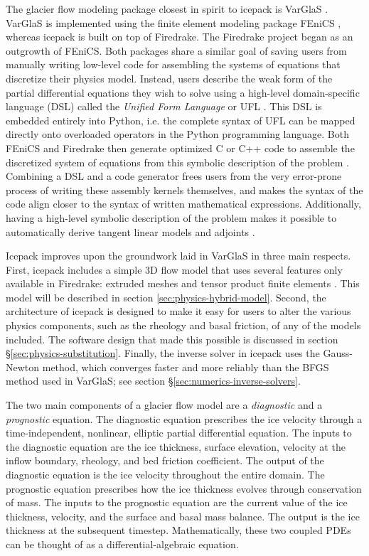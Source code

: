 \documentclass[journal abbreviation, manuscript]{copernicus}
\begin{document}
The glacier flow modeling package closest in spirit to icepack is VarGlaS \citep{brinkerhoff2013data}.
VarGlaS is implemented using the finite element modeling package FEniCS \citep{logg2012automated}, whereas icepack is built on top of Firedrake.
The Firedrake project began as an outgrowth of FEniCS.
Both packages share a similar goal of saving users from manually writing low-level code for assembling the systems of equations that discretize their physics model.
Instead, users describe the weak form of the partial differential equations they wish to solve using a high-level domain-specific language (DSL) called the \emph{Unified Form Language} or UFL \citep{alnaes2014unified}.
This DSL is embedded entirely into Python, i.e. the complete syntax of UFL can be mapped directly onto overloaded operators in the Python programming language.
Both FEniCS and Firedrake then generate optimized C or C++ code to assemble the discretized system of equations from this symbolic description of the problem \citep{kirby2006compiler, rathgeber2016firedrake}.
Combining a DSL and a code generator frees users from the very error-prone process of writing these assembly kernels themselves, and makes the syntax of the code align closer to the syntax of written mathematical expressions.
Additionally, having a high-level symbolic description of the problem makes it possible to automatically derive tangent linear models and adjoints \citep{mitusch2019dolfin}.

Icepack improves upon the groundwork laid in VarGlaS in three main respects.
First, icepack includes a simple 3D flow model that uses several features only available in Firedrake: extruded meshes and tensor product finite elements \citep{bercea2016structure, mcrae2016automated}.
This model will be described in section \ref{sec:physics-hybrid-model}.
Second, the architecture of icepack is designed to make it easy for users to alter the various physics components, such as the rheology and basal friction, of any of the models included.
The software design that made this possible is discussed in section \S\ref{sec:physics-substitution}.
Finally, the inverse solver in icepack uses the Gauss-Newton method, which converges faster and more reliably than the BFGS method used in VarGlaS; see section \S\ref{sec:numerics-inverse-solvers}.

The two main components of a glacier flow model are a \emph{diagnostic} and a \emph{prognostic} equation.
The diagnostic equation prescribes the ice velocity through a time-independent, nonlinear, elliptic partial differential equation.
The inputs to the diagnostic equation are the ice thickness, surface elevation, velocity at the inflow boundary, rheology, and bed friction coefficient.
The output of the diagnostic equation is the ice velocity throughout the entire domain.
The prognostic equation prescribes how the ice thickness evolves through conservation of mass.
The inputs to the prognostic equation are the current value of the ice thickness, velocity, and the surface and basal mass balance.
The output is the ice thickness at the subsequent timestep.
Mathematically, these two coupled PDEs can be thought of as a differential-algebraic equation.
\end{document}
